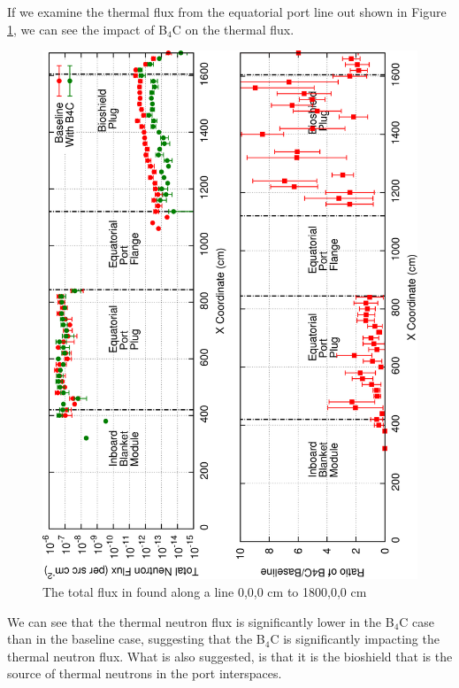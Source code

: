 \documentclass[12pt]{article}
\begin{document}
\newpage
\clearpage
If we examine the thermal flux from the equatorial port line out shown in Figure 
\ref{fig:thermal_flux_ep}, we can see the impact of B$_4$C on the thermal flux.
\begin{figure}[ht!]
  \centering
  \includegraphics[angle=-90,clip,scale=0.15]{../plots/neutron/thermal_flux_ep.png}     
  \caption{The total flux in found along a line 0,0,0 cm to 1800,0,0 cm}
  \label{fig:thermal_flux_ep}
\end{figure}
We can see that the thermal neutron flux is significantly lower
in the B$_4$C case than in the baseline case, suggesting that the B$_4$C is significantly
impacting the thermal neutron flux. What is also suggested, is that it is the bioshield
that is the source of thermal neutrons in the port interspaces.
\end{document}

